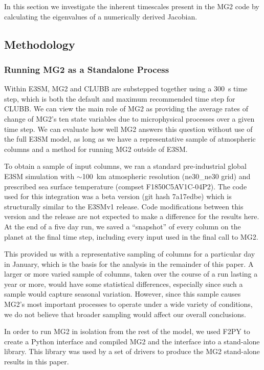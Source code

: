 \documentclass [11pt, proquest] {uwthesis}[2020/02/24]
\begin{document}
In this section we investigate the inherent timescales present in the MG2 code by calculating the eigenvalues of a numerically derived Jacobian.

\subsection{Methodology}

\subsubsection{Running MG2 as a Standalone Process}
\label{sec:MG2-standalone}

Within E3SM, MG2 and CLUBB are substepped together using a \SI{300}{\second} time step, which is both the default and maximum recommended time step for CLUBB. We can view the main role of MG2 as providing the average rates of change of MG2's ten state variables due to microphysical processes over a given time step.  We can evaluate how well MG2 answers this question without use of the full E3SM model, as long as we have a representative sample of atmospheric columns and a method for running MG2 outside of E3SM.

To obtain a sample of input columns, we ran a standard pre-industrial global E3SM simulation with $\sim$\SI{100}{\kilo\meter} atmospheric resolution (ne30\_ne30 grid) and prescribed sea surface temperature (compset F1850C5AV1C-04P2). The code used for this integration was a beta version (git hash 7a17edbe) which is structurally similar to the E3SMv1 release. Code modifications between this version and the release are not expected to make a difference for the results here. At the end of a five day run, we saved a ``snapshot'' of every column on the planet at the final time step, including every input used in the final call to MG2.

This provided us with a representative sampling of columns for a particular day in January, which is the basis for the analysis in the remainder of this paper. A larger or more varied sample of columns, taken over the course of a run lasting a year or more, would have some statistical differences, especially since such a sample would capture seasonal variation. However, since this sample causes MG2's most important processes to operate under a wide variety of conditions, we do not believe that broader sampling would affect our overall conclusions.

In order to run MG2 in isolation from the rest of the model, we used F2PY to create a Python interface and compiled MG2 and the interface into a stand-alone library. This library was used by a set of drivers to produce the MG2 stand-alone results in this paper.
\end{document}
